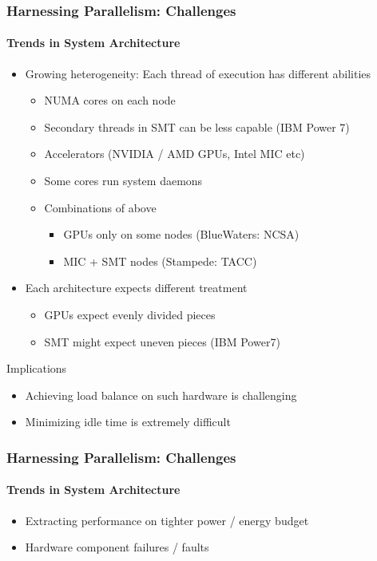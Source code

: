 {\begin{frame}[t]
\frametitle{Harnessing Parallelism: Challenges}
\framesubtitle{Trends in System Architecture}
    \begin{itemize}
        \item Growing heterogeneity: Each thread of execution has different abilities
            \begin{itemize}
                \item NUMA cores on each node
                \item Secondary threads in SMT can be less capable (IBM Power 7)
                \item Accelerators (NVIDIA / AMD GPUs, Intel MIC etc)
                \item Some cores run system daemons
                \item Combinations of above
                    \begin{itemize}
                        \item GPUs only on some nodes (BlueWaters: NCSA)
                        \item MIC + SMT nodes (Stampede: TACC)
                    \end{itemize}
            \end{itemize}
        \pause
        \item Each architecture expects different treatment
            \begin{itemize}
                \item GPUs expect evenly divided pieces
                \item SMT might expect uneven pieces (IBM Power7)
            \end{itemize}
    \end{itemize}
    \pause
    \begin{block}{Implications}
        \begin{itemize}
            \item Achieving load balance on such hardware is challenging
            \item Minimizing idle time is extremely difficult
        \end{itemize}
    \end{block}
\end{frame}


\begin{frame}[t]
\frametitle{Harnessing Parallelism: Challenges}
\framesubtitle{Trends in System Architecture}
  \begin{itemize}
  \item Extracting performance on tighter power / energy budget
  \item Hardware component failures / faults
  \end{itemize}
\end{frame}


}
